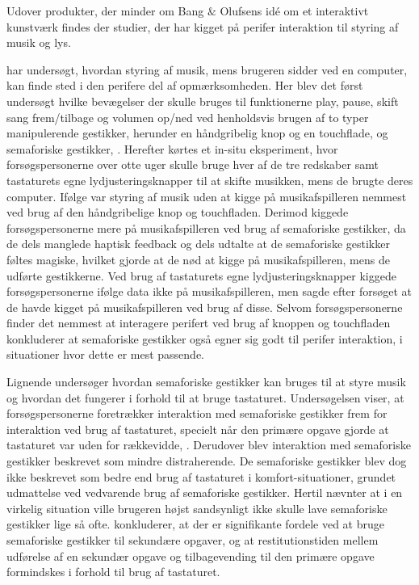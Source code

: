    
   

Udover produkter, der minder om Bang $\&$ Olufsens idé om et interaktivt kunstværk findes der studier, der har kigget på perifer interaktion til styring af musik og lys. 

\textcite[s. 162]{PDF:ComparingInputModalities} har undersøgt, hvordan styring af musik, mens brugeren sidder ved en computer, kan finde sted i den perifere del af opmærksomheden. Her blev det først undersøgt hvilke bevægelser der skulle bruges til funktionerne play, pause, skift sang frem/tilbage og volumen op/ned ved henholdsvis brugen af to typer manipulerende gestikker, herunder en håndgribelig knop og en touchflade, og semaforiske gestikker, \parencite[ss. 165-166]{PDF:ComparingInputModalities}. Herefter kørtes et in-situ eksperiment, hvor forsøgspersonerne over otte uger skulle bruge hver af de tre redskaber samt tastaturets egne lydjusteringsknapper til at skifte musikken, mens de brugte deres computer. Ifølge \textcite[ss. 172-173]{PDF:ComparingInputModalities} var styring af musik uden at kigge på musikafspilleren nemmest ved brug af den håndgribelige knop og touchfladen. Derimod kiggede forsøgspersonerne mere på musikafspilleren ved brug af semaforiske gestikker, da de dels manglede haptisk feedback og dels udtalte at de semaforiske gestikker føltes magiske, hvilket gjorde at de nød at kigge på musikafspilleren, mens de udførte gestikkerne. Ved brug af tastaturets egne lydjusteringsknapper kiggede forsøgspersonerne ifølge data ikke på musikafspilleren, men sagde efter forsøget at de havde kigget på musikafspilleren ved brug af disse. Selvom forsøgspersonerne finder det nemmest at interagere perifert ved brug af knoppen og touchfladen konkluderer \textcite[s. 177]{PDF:ComparingInputModalities} at semaforiske gestikker også egner sig godt til perifer interaktion, i situationer hvor dette er mest passende.

Lignende \textcite{PDF:ComparingInputModalities} undersøger \textcite{PDF:AStudyOnTheUseOfSemaphoricGestures} hvordan semaforiske gestikker kan bruges til at styre musik og hvordan det fungerer i forhold til at bruge tastaturet. Undersøgelsen viser, at forsøgspersonerne foretrækker interaktion med semaforiske gestikker frem for interaktion ved brug af tastaturet, specielt når den primære opgave gjorde at tastaturet var uden for rækkevidde, \parencite[s. 1963]{PDF:AStudyOnTheUseOfSemaphoricGestures}. Derudover blev interaktion med semaforiske gestikker beskrevet som mindre distraherende. De semaforiske gestikker blev dog ikke beskrevet som bedre end brug af tastaturet i komfort-situationer, grundet udmattelse ved vedvarende brug af semaforiske gestikker. Hertil nævnter \textcite[s. 1963]{PDF:AStudyOnTheUseOfSemaphoricGestures} at i en virkelig situation ville brugeren højst sandsynligt ikke skulle lave semaforiske gestikker lige så ofte. \textcite[s. 1964]{PDF:AStudyOnTheUseOfSemaphoricGestures} konkluderer, at der er signifikante fordele ved at bruge semaforiske gestikker til sekundære opgaver, og at restitutionstiden mellem udførelse af en sekundær opgave og tilbagevending til den primære opgave formindskes i forhold til brug af tastaturet.

